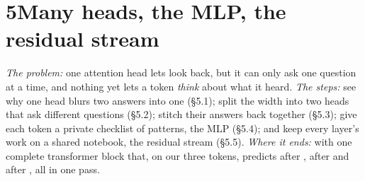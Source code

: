 \newpage
\section*{5\quad Many heads, the MLP, the residual stream}
\ifdefined\fitwidthFourFive\else
\newsavebox{\fitboxFourFive}
\newcommand{\fitwidthFourFive}[1]{\sbox{\fitboxFourFive}{\begin{tabular}{@{}c@{}}#1\end{tabular}}\ifdim\wd\fitboxFourFive>\linewidth\resizebox{\linewidth}{!}{\usebox{\fitboxFourFive}}\else\usebox{\fitboxFourFive}\fi}
\fi

\begin{chaptermap}
\emph{The problem:} one attention head lets  look back, but it can only ask one question at a time,
and nothing yet lets a token \emph{think} about what it heard. \emph{The steps:} see why one head blurs two
answers into one (\S5.1); split the width into two heads that ask different questions (\S5.2); stitch their
answers back together (\S5.3); give each token a private checklist of patterns, the MLP (\S5.4); and keep
every layer's work on a shared notebook, the residual stream (\S5.5). \emph{Where it ends:} with one complete
transformer block that, on our three tokens, predicts  after ,  after 
and  after , all in one pass.
\end{chaptermap}


